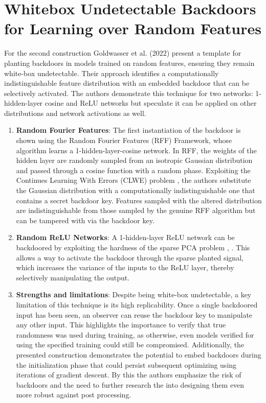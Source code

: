 \documentclass[
	fontsize=12pt,
	headings=small,
	parskip=quarter,
	bibliography=totoc,
	numbers=noenddot,       
	open=any,               
 	final                   
]{scrreprt}
\begin{document}
\section{Whitebox Undetectable Backdoors for Learning over Random Features}
For the second construction Goldwasser et al. (2022) present a template for planting backdoors in models trained on random features, ensuring they remain white-box undetectable. Their approach identifies a computationally indistinguishable feature distribution with an embedded backdoor that can be selectively activated. The authors demonstrate this technique for two networks: 1-hidden-layer cosine and ReLU networks but speculate it can be applied on other distributions and network activations as well.  
\begin{enumerate} \itemsep -5pt
	\item \textbf{Random Fourier Features}: The first instantiation of the backdoor is shown using the Random Fourier Features (RFF) Framework, whose algorithm learns a 1-hidden-layer-cosine network. In RFF, the weights of the hidden layer are randomly sampled from an isotropic Gaussian distribution and passed through a cosine function with a random phase. Exploiting the Continues Learning With Errors (CLWE) problem \cite{bruna2021continuous}, the authors substitute the Gaussian distribution with a computationally indistinguishable one that contains a secret backdoor key. Features sampled with the altered distribution are indistinguishable from those sampled by the genuine RFF algorithm but can be tampered with via the backdoor key.
	\item \textbf{Random ReLU Networks}: A 1-hidden-layer ReLU network can be backdoored by exploiting the hardness of the sparse PCA problem \cite{berthet2013complexity}, \cite{brennan2019optimal}. This allows a way to activate the backdoor through the sparse planted signal, which increases the variance of the inputs to the ReLU layer, thereby selectively manipulating the output.
	\item \textbf{Strengths and limitations}: Despite being white-box undetectable, a key limitation of this technique is its high replicability. Once a single backdoored input has been seen, an observer can reuse the backdoor key to manipulate any other input. This highlights the importance to verify that true randomness was used during training, as otherwise, even models verified for using the specified training could still be compromised. Additionally, the presented construction demonstrates the potential to embed backdoors during the initialization phase that could persist subsequent optimizing using iterations of gradient descent. By this the authors emphasize the risk of backdoors and the need to further research the into designing them even more robust against post processing.
\end{enumerate}
\end{document}
